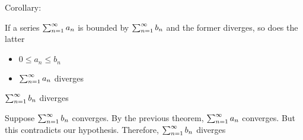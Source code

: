 Corollary:

\begin{property}{If a series $\sum_{n=1}^{\infty} a_n$ is bounded by $\sum_{n=1}^{\infty} b_n$ and the former diverges, so does the latter}
    \begin{precondition}
        \begin{itemize}
            \item $0 ≤ a_n ≤ b_n$
            \item $\sum_{n=1}^{\infty} a_n$ diverges
        \end{itemize}
    \end{precondition}
    \begin{claim}
        $\sum_{n=1}^{\infty} b_n$ diverges
    \end{claim}
    \begin{Proof}
        Suppose $\sum_{n=1}^{\infty} b_n$ converges. By the previous theorem, $\sum_{n=1}^{\infty} a_n$ converges. But this contradicts our hypothesis. Therefore, $\sum_{n=1}^{\infty} b_n$ diverges
    \end{Proof}
\end{property}

